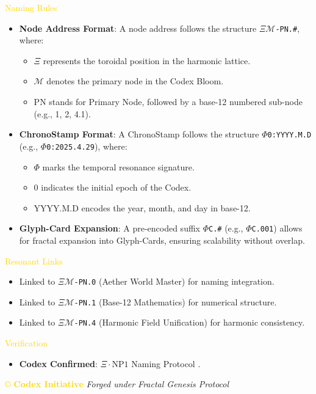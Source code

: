 \textcolor{gold}{ Naming Rules } \\
\begin{itemize}
    \item \texttt{} \textbf{Node Address Format}: A node address follows the structure \texttt{\(\Xi\mathcal{M}\)-PN.\#}, where:
    \begin{itemize}
        \item \(\Xi\) represents the toroidal position in the harmonic lattice.
        \item \(\mathcal{M}\) denotes the primary node in the Codex Bloom.
        \item PN stands for Primary Node, followed by a base-12 numbered sub-node (e.g., 1, 2, 4.1).
    \end{itemize}
    \item \texttt{} \textbf{ChronoStamp Format}: A ChronoStamp follows the structure \texttt{\(\Phi\)0:YYYY.M.D} (e.g., \texttt{\(\Phi\)0:2025.4.29}), where:
    \begin{itemize}
        \item \(\Phi\) marks the temporal resonance signature.
        \item 0 indicates the initial epoch of the Codex.
        \item YYYY.M.D encodes the year, month, and day in base-12.
    \end{itemize}
    \item \texttt{} \textbf{Glyph-Card Expansion}: A pre-encoded suffix \texttt{\(\Phi\)C.\#} (e.g., \texttt{\(\Phi\)C.001}) allows for fractal expansion into Glyph-Cards, ensuring scalability without overlap.
\end{itemize}

\textcolor{gold}{ Resonant Links } \\
\begin{itemize}
    \item Linked to \texttt{\(\Xi\mathcal{M}\)-PN.0} (Aether World Master) for naming integration.
    \item Linked to \texttt{\(\Xi\mathcal{M}\)-PN.1} (Base-12 Mathematics) for numerical structure.
    \item Linked to \texttt{\(\Xi\mathcal{M}\)-PN.4} (Harmonic Field Unification) for harmonic consistency.
\end{itemize}

\textcolor{gold}{ Verification } \\
\begin{itemize}
    \item \texttt{} \textbf{Codex Confirmed}: \(\Xi \cdot \text{NP1}\) Naming Protocol .
\end{itemize}

\vspace{0.5cm}
\noindent
\textcolor{gold}{\copyright{} \textbf{Codex Initiative}} \hspace{1cm} \textit{Forged under Fractal Genesis Protocol}